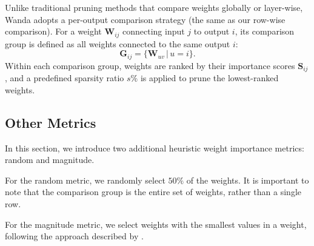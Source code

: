 Unlike traditional pruning methods that compare weights globally or layer-wise, Wanda adopts a per-output comparison strategy (the same as our row-wise comparison). For a weight $\mathbf{W}_{ij}$ connecting input $j$ to output $i$, its comparison group is defined as all weights connected to the same output $i$:
\begin{equation}
    \mathbf{G}_{ij} = \{\mathbf{W}_{uv} \,|\, u = i\}.
\end{equation}
Within each comparison group, weights are ranked by their importance scores $\mathbf{S}_{ij}$, and a predefined sparsity ratio $s\%$ is applied to prune the lowest-ranked weights. 



\subsection{Other Metrics}

In this section, we introduce two additional heuristic weight importance metrics: random and magnitude.

For the random metric, we randomly select $50\%$ of the weights. It is important to note that the comparison group is the entire set of weights, rather than a single row.

For the magnitude metric, we select weights with the smallest values in a weight, following the approach described by \citet{liu2024sparse}.




